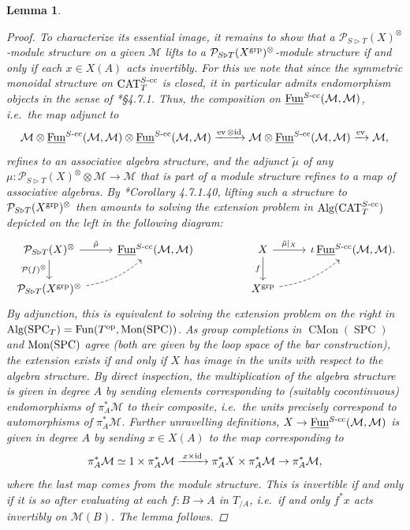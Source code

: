 \documentclass[reqno]{memo-l}
\theoremstyle{mythm}
\newtheorem{lemma}[thm]{Lemma}
\theoremstyle{definition}
\numberwithin{equation}{section}
\newcommand{\Mm}{{\mathcal{M}}}
\DeclareMathOperator{\ev}{ev}
\DeclareMathOperator{\SPC}{SPC}
\DeclareMathOperator{\CAT}{CAT}
\newcommand{\Fun}{{\textup{Fun}}}
\DeclareMathOperator{\CMon}{CMon}
\newcommand{\op}{{\textup{op}}}
\DeclareMathOperator{\core}{\iota}
\DeclareMathOperator{\Alg}{\textup{Alg}}
\newcommand{\id}{\textup{id}}
\newcommand{\ulhelper}[2]{\underline{\setbox0=\hbox{$#1#2$}\dp0=0.4pt \box0\relax}}
\newcommand{\ul}[1]{{\mathpalette\ulhelper{#1}}\hbox{\rule[-2pt]{0pt}{0pt}}}
\newcommand{\grp}{\textup{grp}}
\begin{document}
\begin{lemma}
\begin{proof}
        To characterize its essential image, it remains to show that a $\mathcal P_{S\triangleright T}(X)^{\otimes}$-module structure on a given $\Mm$ lifts to a $\mathcal P_{S\triangleright T}(X^{\grp})^{\otimes}$-module structure if and only if each $x\in X(A)$ acts invertibly. For this we note that since the symmetric monoidal structure on $\CAT_T^\textup{$S$-cc}$ is closed, it in particular admits endomorphism objects in the sense of \cite{HA}*{§4.7.1}. Thus, the composition on $\ul\Fun^\textup{$S$-cc}(\Mm,\Mm)$, i.e.~the map adjunct to
        \[
            \Mm\otimes\ul\Fun^\textup{$S$-cc}(\Mm,\Mm)\otimes\ul\Fun^\textup{$S$-cc}(\Mm,\Mm)\xrightarrow{\ev\otimes\id}\Mm\otimes\ul\Fun^\textup{$S$-cc}(\Mm,\Mm)\xrightarrow{\ev}\Mm,
        \]
        refines to an associative algebra structure, and the adjunct $\tilde\mu$ of any $\mu\colon\mathcal P_{S\triangleright T}(X)^{\otimes}\otimes\Mm\to\Mm$ that is part of a module structure refines to a map of associative algebras. By \cite{HA}*{Corollary 4.7.1.40}, lifting such a structure to $\mathcal P_{S\triangleright T}(X^{\grp})^{\otimes}$ then amounts to solving the extension problem in $\Alg(\CAT^\text{$S$-cc}_T)$ depicted on the left in the following diagram:
        \[
            \begin{tikzcd}
                \mathcal P_{S\triangleright T}(X)^{\otimes}\arrow[d,"\mathcal P(f)^{\otimes}"']\arrow[r,"\tilde\mu"] & \ul\Fun^\textup{$S$-cc}(\Mm,\Mm) &[2em] X\arrow[d,"f"']\arrow[r,"\tilde\mu|_X"] & \core\ul\Fun^\textup{$S$-cc}(\Mm,\Mm)\rlap. \\
                \mathcal P_{S\triangleright T}(X^{\grp})^{\otimes}\arrow[ur, bend right=15pt, dashed] && X^\grp\arrow[ur, bend right=15pt, dashed]
            \end{tikzcd}
        \]        
        By adjunction, this is equivalent to solving the extension problem on the right in $\Alg(\SPC_T)=\Fun(T^\op,\textup{Mon}(\SPC))$. As group completions in $\CMon(\SPC)$ and $\textup{Mon}(\SPC)$ agree (both are given by the loop space of the bar construction), the extension exists if and only if $X$ has image in the units with respect to the algebra structure. By direct inspection, the multiplication of the algebra structure is given in degree $A$ by sending elements corresponding to (suitably cocontinuous) endomorphisms of $\pi_A^*\Mm$ to their composite, i.e.~the units precisely correspond to \emph{auto}morphisms of $\pi_A^*\Mm$. Further unravelling definitions, $X\to\ul\Fun^\textup{$S$-cc}(\Mm,\Mm)$ is given in degree $A$ by sending $x\in X(A)$ to the map corresponding to
        \[
            \pi_A^*\Mm\simeq1\times\pi_A^*\Mm\xrightarrow{\;x\times\id\;}\pi_A^*X\times\pi_A^*\Mm\to\pi_A^*\Mm,
        \]
        where the last map comes from the module structure. This is invertible if and only if it is so after evaluating at each $f\colon B\to A$ in $T_{/A}$, i.e.~if and only $f^*x$ acts invertibly on $\Mm(B)$. The lemma follows.
    \end{proof}
\end{lemma}
\end{document}
